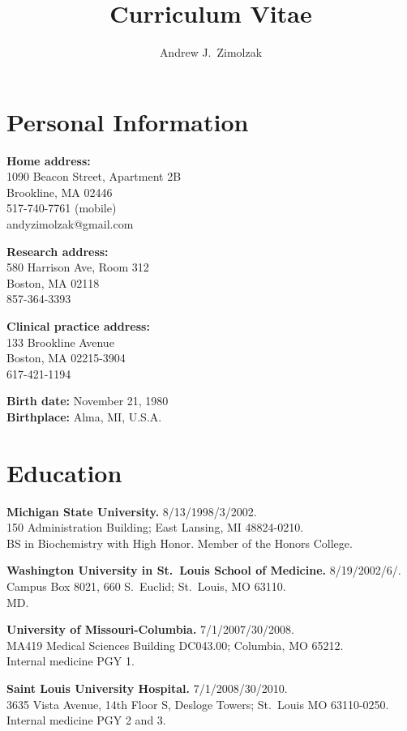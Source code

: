 \documentclass[12pt]{article}
\title{Curriculum Vitae}
\author{Andrew J.\ Zimolzak}
\begin{document}
\thispagestyle{fancy}

\section*{Personal Information}

\textbf{Home address:}\\
1090 Beacon Street, Apartment 2B\\
Brookline, MA 02446\\
517-740-7761 (mobile)\\
andyzimolzak@gmail.com

\textbf{Research address:}\\
580 Harrison Ave, Room 312\\
Boston, MA 02118\\
857-364-3393

\textbf{Clinical practice address:}\\
133 Brookline Avenue\\
Boston, MA 02215-3904\\
617-421-1194

\textbf{Birth date:} November 21, 1980\\
\textbf{Birthplace:} Alma, MI, U.S.A.

\section*{Education}

\textbf{Michigan State University.} 8/13/1998/3/2002.\\
150 Administration Building; East Lansing, MI 48824-0210.\\
BS in Biochemistry with High Honor. Member of the Honors College.

\textbf{Washington University in St.\ Louis School of Medicine.}
8/19/2002\ndash{}/6/.\\
Campus Box 8021, 660 S.\ Euclid; St.\ Louis, MO 63110.\\
MD.

\textbf{University of Missouri-Columbia.} 7/1/2007/30/2008.\\
MA419 Medical Sciences Building DC043.00; Columbia, MO 65212.\\
Internal medicine PGY 1.

\textbf{Saint Louis University Hospital.} 7/1/2008/30/2010.\\
3635 Vista Avenue, 14th Floor S, Desloge Towers; St.\ Louis MO
63110-0250.\\
Internal medicine PGY 2 and 3.
\end{document}

